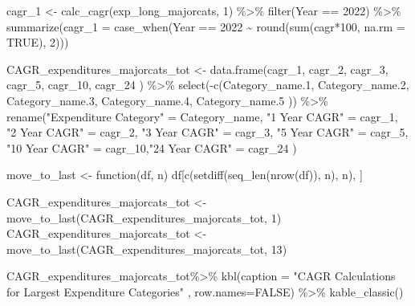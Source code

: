 \documentclass[
  letterpaper,
  DIV=11,
  numbers=noendperiod]{scrreport}
\newenvironment{Shaded}{\begin{snugshade}}{\end{snugshade}}
\newcommand{\AttributeTok}[1]{\textcolor[rgb]{0.40,0.45,0.13}{#1}}
\newcommand{\ConstantTok}[1]{\textcolor[rgb]{0.56,0.35,0.01}{#1}}
\newcommand{\ControlFlowTok}[1]{\textcolor[rgb]{0.00,0.23,0.31}{#1}}
\newcommand{\DecValTok}[1]{\textcolor[rgb]{0.68,0.00,0.00}{#1}}
\newcommand{\FloatTok}[1]{\textcolor[rgb]{0.68,0.00,0.00}{#1}}
\newcommand{\FunctionTok}[1]{\textcolor[rgb]{0.28,0.35,0.67}{#1}}
\newcommand{\NormalTok}[1]{\textcolor[rgb]{0.00,0.23,0.31}{#1}}
\newcommand{\OtherTok}[1]{\textcolor[rgb]{0.00,0.23,0.31}{#1}}
\newcommand{\SpecialCharTok}[1]{\textcolor[rgb]{0.37,0.37,0.37}{#1}}
\newcommand{\StringTok}[1]{\textcolor[rgb]{0.13,0.47,0.30}{#1}}
\begin{document}
\begin{Shaded}
\begin{Highlighting}[]
\NormalTok{cagr\_1 }\OtherTok{\textless{}{-}} \FunctionTok{calc\_cagr}\NormalTok{(exp\_long\_majorcats, }\DecValTok{1}\NormalTok{) }\SpecialCharTok{\%\textgreater{}\%} 
  \FunctionTok{filter}\NormalTok{(Year }\SpecialCharTok{==} \DecValTok{2022}\NormalTok{) }\SpecialCharTok{\%\textgreater{}\%}
  \FunctionTok{summarize}\NormalTok{(}\AttributeTok{cagr\_1 =} \FunctionTok{case\_when}\NormalTok{(Year }\SpecialCharTok{==} \DecValTok{2022} \SpecialCharTok{\textasciitilde{}} \FunctionTok{round}\NormalTok{(}\FunctionTok{sum}\NormalTok{(cagr}\SpecialCharTok{*}\DecValTok{100}\NormalTok{, }\AttributeTok{na.rm =} \ConstantTok{TRUE}\NormalTok{), }\DecValTok{2}\NormalTok{)))}

\NormalTok{CAGR\_expenditures\_majorcats\_tot }\OtherTok{\textless{}{-}} \FunctionTok{data.frame}\NormalTok{(cagr\_1, cagr\_2, cagr\_3, cagr\_5, cagr\_10, cagr\_24 ) }\SpecialCharTok{\%\textgreater{}\%} 
  \FunctionTok{select}\NormalTok{(}\SpecialCharTok{{-}}\FunctionTok{c}\NormalTok{(Category\_name}\FloatTok{.1}\NormalTok{, Category\_name}\FloatTok{.2}\NormalTok{, Category\_name}\FloatTok{.3}\NormalTok{, Category\_name}\FloatTok{.4}\NormalTok{, Category\_name}\FloatTok{.5}\NormalTok{ )) }\SpecialCharTok{\%\textgreater{}\%} 
  \FunctionTok{rename}\NormalTok{(}\StringTok{"Expenditure Category"} \OtherTok{=}\NormalTok{ Category\_name, }\StringTok{"1 Year CAGR"} \OtherTok{=}\NormalTok{ cagr\_1, }\StringTok{"2 Year CAGR"} \OtherTok{=}\NormalTok{ cagr\_2, }\StringTok{"3 Year CAGR"} \OtherTok{=}\NormalTok{ cagr\_3, }\StringTok{"5 Year CAGR"} \OtherTok{=}\NormalTok{ cagr\_5, }\StringTok{"10 Year CAGR"} \OtherTok{=}\NormalTok{ cagr\_10,}\StringTok{"24 Year CAGR"} \OtherTok{=}\NormalTok{ cagr\_24 )}

\NormalTok{move\_to\_last }\OtherTok{\textless{}{-}} \ControlFlowTok{function}\NormalTok{(df, n) df[}\FunctionTok{c}\NormalTok{(}\FunctionTok{setdiff}\NormalTok{(}\FunctionTok{seq\_len}\NormalTok{(}\FunctionTok{nrow}\NormalTok{(df)), n), n), ]}

\NormalTok{CAGR\_expenditures\_majorcats\_tot }\OtherTok{\textless{}{-}} \FunctionTok{move\_to\_last}\NormalTok{(CAGR\_expenditures\_majorcats\_tot, }\DecValTok{1}\NormalTok{)}
\NormalTok{CAGR\_expenditures\_majorcats\_tot }\OtherTok{\textless{}{-}} \FunctionTok{move\_to\_last}\NormalTok{(CAGR\_expenditures\_majorcats\_tot, }\DecValTok{13}\NormalTok{) }


\NormalTok{CAGR\_expenditures\_majorcats\_tot}\SpecialCharTok{\%\textgreater{}\%}   
  \FunctionTok{kbl}\NormalTok{(}\AttributeTok{caption =} \StringTok{"CAGR Calculations for Largest Expenditure Categories"}\NormalTok{ , }\AttributeTok{row.names=}\ConstantTok{FALSE}\NormalTok{) }\SpecialCharTok{\%\textgreater{}\%} 
     \FunctionTok{kable\_classic}\NormalTok{() }
\end{Highlighting}
\end{Shaded}
\end{document}
